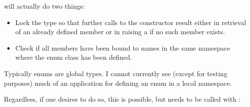 \documentclass[letterpaper,10pt,english]{sphinxmanual}
\begin{document}
\sphinxAtStartPar
{} will actually do two things:
\begin{itemize}
\item {} 
\sphinxAtStartPar
Lock the type so that further calls to the constructor result either
in retrieval of an already defined member or in raising a
 if no such member exists.

\item {} 
\sphinxAtStartPar
Check if all members have been bound to names in the same namespace
where the enum class has been defined.

\end{itemize}
\def\sphinxLiteralBlockLabel{\label{\detokenize{enums:id2}}}
\begin{sphinxVerbatim}[commandchars=\\\{\}]
   

 
      
\end{sphinxVerbatim}

\sphinxAtStartPar
Typically enums are global types. I cannot currently see (except for
testing purposes) much of an application for defining an enum in a
local namespace.

\sphinxAtStartPar
Regardless, if one desires to do so, this is possible, but
 needs to be called with :
\def\sphinxLiteralBlockLabel{\label{\detokenize{enums:id3}}}
\begin{sphinxVerbatim}[commandchars=\\\{\}]
 

  
  

\end{sphinxVerbatim}
\end{document}
